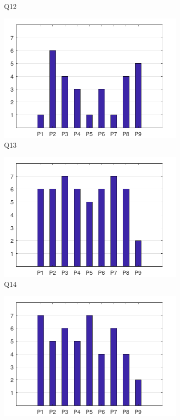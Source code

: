 \documentclass[english, 12pt, a4paper, pdftex, elec, utf8]{aaltothesis}
\begin{document}
\begin{figure}[h!]
\begin{subfigure}[b]{0.49\textwidth}
        \caption*{Q12}
    \end{subfigure}
    \begin{subfigure}[b]{0.49\textwidth}
        \includegraphics[width=\textwidth]{T2_4.pdf}
        \caption*{Q13}
    \end{subfigure}
    \begin{subfigure}[b]{0.49\textwidth}
        \includegraphics[width=\textwidth]{T2_5.pdf}
        \caption*{Q14}
    \end{subfigure}
    \begin{subfigure}[b]{0.49\textwidth}
        \includegraphics[width=\textwidth]{T2_6.pdf}

\end{subfigure}
\end{figure}
\end{document}
